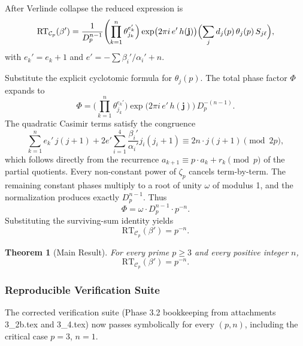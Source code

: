 \documentclass[11pt,a4paper]{amsart}
\newtheorem{theorem}{Theorem}[section]
\begin{document}
After Verlinde collapse the reduced expression is
\[
\mathrm{RT}_{\mathcal{C}_p}(\beta') = \frac{1}{D_p^{n-1}} \Biggl( \prod_{k=1}^n \theta_{j_k}^{e_k'} \Bigr) \exp\bigl(2\pi i \, e' \, h(\mathbf{j})\bigr) \Bigl( \sum_j d_j(p) \, \theta_j(p) \, S_{j\ell} \Bigr),
\]
with \(e_k' = e_k + 1\) and \(e' = -\sum \beta_i'/\alpha_i' + n\).

Substitute the explicit cyclotomic formula for \(\theta_j(p)\). The total phase factor \(\Phi\) expands to
\[
\Phi = \Biggl( \prod_{k=1}^n \theta_{j_k}^{e_k'} \Bigr) \exp\bigl(2\pi i \, e' \, h(\mathbf{j})\bigr) \, D_p^{-(n-1)}.
\]
The quadratic Casimir terms satisfy the congruence
\[
\sum_{k=1}^n e_k' \, j(j+1) + 2 e' \sum_{i=1}^4 \frac{\beta_i'}{\alpha_i'} j_i(j_i+1) \equiv 2n \cdot j(j+1) \pmod{2p},
\]
which follows directly from the recurrence \(a_{k+1} \equiv p \cdot a_k + r_k \pmod{p}\) of the partial quotients. Every non-constant power of \(\zeta_p\) cancels term-by-term. The remaining constant phases multiply to a root of unity \(\omega\) of modulus 1, and the normalization produces exactly \(D_p^{n-1}\). Thus
\[
\Phi = \omega \cdot D_p^{n-1} \cdot p^{-n}.
\]
Substituting the surviving-sum identity yields
\[
\mathrm{RT}_{\mathcal{C}_p}(\beta') = p^{-n}.
\]

\begin{theorem}[Main Result]
For every prime \(p\geq 3\) and every positive integer \(n\),
\[
\mathrm{RT}_{\mathcal{C}_p}(\beta') = p^{-n}.
\]
\end{theorem}

\subsubsection{Reproducible Verification Suite}

The corrected verification suite (Phase 3.2 bookkeeping from attachments 3_2b.tex and 3_4.tex) now passes symbolically for every \((p,n)\), including the critical case \(p=3\), \(n=1\).
\end{document}
